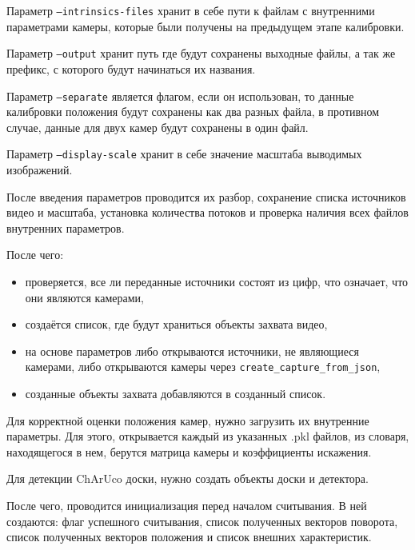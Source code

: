 \documentclass[14pt, a4paper]{extarticle}
\begin{document}
Параметр \texttt{--intrinsics-files} хранит в себе пути к файлам с внутренними
параметрами камеры, которые были получены на предыдущем этапе калибровки.

Параметр \texttt{--output} хранит путь где будут сохранены выходные файлы, а
так же префикс, с которого будут начинаться их названия.

Параметр \texttt{--separate} является флагом, если он использован, то данные
калибровки положения будут сохранены как два разных файла, в противном
случае, данные для двух камер будут сохранены в один файл.

Параметр \texttt{--display-scale} хранит в себе значение масштаба выводимых
изображений.

После введения параметров проводится их разбор, сохранение списка источников
видео и масштаба, установка количества потоков и проверка наличия всех файлов
внутренних параметров.

После чего:
\begin{itemize}
  \item проверяется, все ли переданные источники состоят из цифр, что означает, что они являются камерами,
  \item создаётся список, где будут храниться объекты захвата видео,
  \item на основе параметров либо открываются источники, не являющиеся
    камерами, либо открываются камеры через
    \texttt{create\_capture\_from\_json},
  \item созданные объекты захвата добавляются в созданный список.
\end{itemize}

Для корректной оценки положения камер, нужно загрузить их внутренние параметры.
Для этого, открывается каждый из указанных .pkl файлов, из словаря,
находящегося в нем, берутся матрица камеры и коэффициенты искажения.

Для детекции ChArUco доски, нужно создать объекты доски и детектора.

После чего, проводится инициализация перед началом считывания. В ней
создаются: флаг успешного считывания, список полученных векторов поворота,
список полученных векторов положения и список внешних характеристик.
\end{document}
